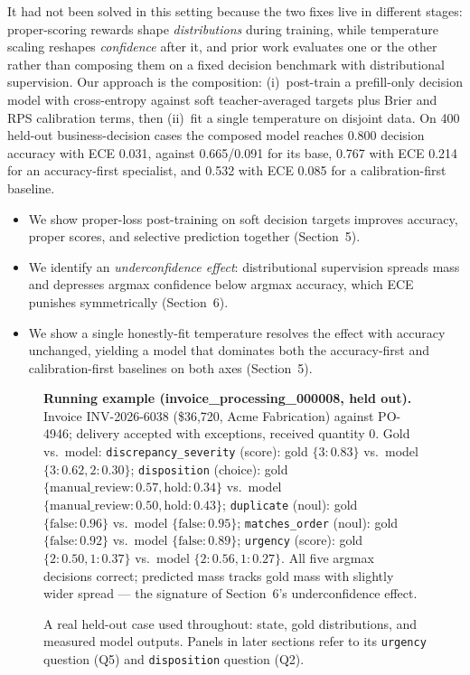 \documentclass{article}
\begin{document}
It had not been solved in this setting because the two fixes live in
different stages: proper-scoring rewards shape \emph{distributions} during
training, while temperature scaling reshapes \emph{confidence} after it, and
prior work evaluates one or the other rather than composing them on a fixed
decision benchmark with distributional supervision. Our approach is the
composition: (i)~post-train a prefill-only decision model with
cross-entropy against soft teacher-averaged targets plus Brier and RPS
calibration terms, then (ii)~fit a single temperature on disjoint data.
On 400 held-out business-decision cases the composed model reaches 0.800
decision accuracy with ECE 0.031, against 0.665/0.091 for its base, 0.767
with ECE 0.214 for an accuracy-first specialist, and 0.532 with ECE 0.085
for a calibration-first baseline.

\begin{itemize}
\item We show proper-loss post-training on soft decision targets improves
accuracy, proper scores, and selective prediction together (Section~5).
\item We identify an \emph{underconfidence effect}: distributional
supervision spreads mass and depresses argmax confidence below argmax
accuracy, which ECE punishes symmetrically (Section~6).
\item We show a single honestly-fit temperature resolves the effect with
accuracy unchanged, yielding a model that dominates both the
accuracy-first and calibration-first baselines on both axes (Section~5).
\end{itemize}

\begin{figure}[t]
\centering
\begin{minipage}{0.92\linewidth}\small
\textbf{Running example (invoice\_processing\_000008, held out).} Invoice
INV-2026-6038 (\$36,720, Acme Fabrication) against PO-4946; delivery
accepted with exceptions, received quantity 0. Gold vs.\ model:
\texttt{discrepancy\_severity} (score): gold $\{3{:}0.83\}$ vs.\ model
$\{3{:}0.62, 2{:}0.30\}$; \texttt{disposition} (choice): gold
$\{\text{manual\_review}{:}0.57, \text{hold}{:}0.34\}$ vs.\ model
$\{\text{manual\_review}{:}0.50, \text{hold}{:}0.43\}$;
\texttt{duplicate} (noul): gold $\{\text{false}{:}0.96\}$ vs.\ model
$\{\text{false}{:}0.95\}$; \texttt{matches\_order} (noul): gold
$\{\text{false}{:}0.92\}$ vs.\ model $\{\text{false}{:}0.89\}$;
\texttt{urgency} (score): gold $\{2{:}0.50, 1{:}0.37\}$ vs.\ model
$\{2{:}0.56, 1{:}0.27\}$. All five argmax decisions correct; predicted mass
tracks gold mass with slightly wider spread — the signature of
Section~6's underconfidence effect.
\end{minipage}
\caption{A real held-out case used throughout: state, gold distributions,
and measured model outputs. Panels in later sections refer to its
\texttt{urgency} question (Q5) and \texttt{disposition} question (Q2).}
\label{fig:running}
\end{figure}
\end{document}
